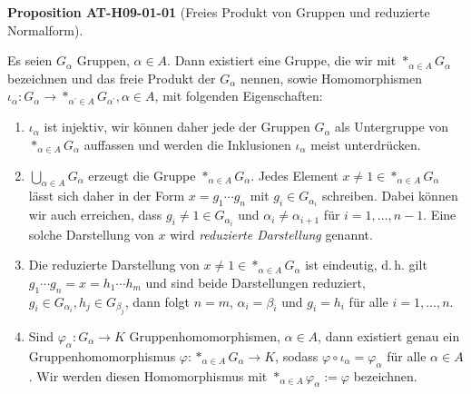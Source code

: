 \documentclass[10pt, letterpaper]{article}
\newcommand{\CustomHeading}[3]{%
  \par\medskip\noindent%
  \textbf{#1 #2} \textnormal{(#3)}.\enskip%
}
\newenvironment{PROP}[2]{\CustomHeading{Proposition}{#1}{#2}}{}
\begin{document}
\begin{PROP}{AT-H09-01-01}{Freies Produkt von Gruppen und reduzierte Normalform}
Es seien $G_\alpha$ Gruppen, $\alpha \in A$. Dann existiert eine Gruppe, die wir mit $*_{\alpha \in A} G_\alpha$ bezeichnen und das freie Produkt der $G_\alpha$ nennen, sowie Homomorphismen $\iota_\alpha: G_\alpha \rightarrow *_{\alpha^{\prime} \in A} G_{\alpha^{\prime}}, \alpha \in A$, mit folgenden Eigenschaften:
\begin{enumerate}
  \item $\iota_\alpha$ ist injektiv, wir können daher jede der Gruppen $G_\alpha$ als Untergruppe von $*_{\alpha \in A} G_\alpha$ auffassen und werden die Inklusionen $\iota_\alpha$ meist unterdrücken.
  
  \item $\bigcup_{\alpha \in A} G_\alpha$ erzeugt die Gruppe $*_{\alpha \in A} G_\alpha$. Jedes Element $x \neq 1 \in *_{\alpha \in A} G_\alpha$ lässt sich daher in der Form $x = g_1 \cdots g_n$ mit $g_i \in G_{\alpha_i}$ schreiben. Dabei können wir auch erreichen, dass $g_i \neq 1 \in G_{\alpha_i}$ und $\alpha_i \neq \alpha_{i+1}$ für $i = 1, \ldots, n-1$. Eine solche Darstellung von $x$ wird \emph{reduzierte Darstellung} genannt.
  
  \item Die reduzierte Darstellung von $x \neq 1 \in *_{\alpha \in A} G_\alpha$ ist eindeutig, d.\,h. gilt $g_1 \cdots g_n = x = h_1 \cdots h_m$ und sind beide Darstellungen reduziert, $g_i \in G_{\alpha_i}, h_j \in G_{\beta_j}$, dann folgt $n = m$, $\alpha_i = \beta_i$ und $g_i = h_i$ für alle $i = 1, \ldots, n$.
  
  \item Sind $\varphi_\alpha: G_\alpha \rightarrow K$ Gruppenhomomorphismen, $\alpha \in A$, dann existiert genau ein Gruppenhomomorphismus $\varphi: *_{\alpha \in A} G_\alpha \rightarrow K$, sodass $\varphi \circ \iota_\alpha = \varphi_\alpha$ für alle $\alpha \in A$. Wir werden diesen Homomorphismus mit $*_{\alpha \in A} \varphi_\alpha := \varphi$ bezeichnen.
\end{enumerate}
\end{PROP}
\end{document}
